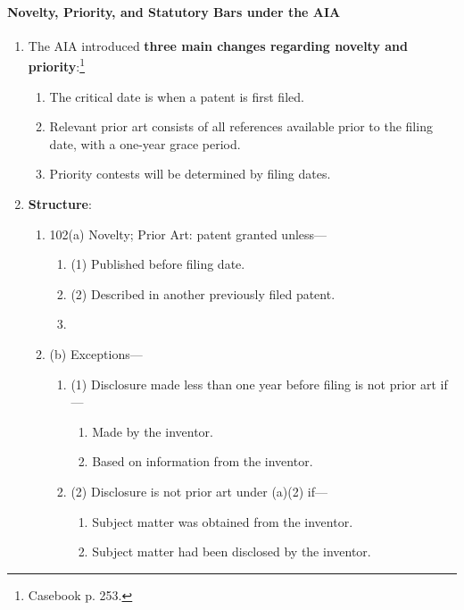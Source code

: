 \paragraph{Novelty, Priority, and Statutory Bars under the AIA}

\begin{enumerate}
    \item The AIA introduced \textbf{three main changes regarding novelty and 
    priority}:\footnote{Casebook p. 253.}
    \begin{enumerate}
        \item The critical date is when a patent is first filed.
        \item Relevant prior art consists of all references available prior to 
        the filing date, with a one-year grace period.
        \item Priority contests will be determined by filing dates.
    \end{enumerate}
    \item \textbf{Structure}:
    \begin{enumerate}
        \item 102(a) Novelty; Prior Art: patent granted unless---
        \begin{enumerate}
            \item (1) Published before filing date.
            \item (2) Described in another previously filed patent.
            \item 
        \end{enumerate}
        \item (b) Exceptions---
        \begin{enumerate}
            \item (1) Disclosure made less than one year before filing is not 
            prior art if---
            \begin{enumerate}
                \item Made by the inventor.
                \item Based on information from the inventor.
            \end{enumerate}
            \item (2) Disclosure is not prior art under (a)(2) if---
            \begin{enumerate}
                \item Subject matter was obtained from the inventor.
                \item Subject matter had been disclosed by the inventor.

\end{enumerate}
\end{enumerate}
\end{enumerate}
\end{enumerate}
